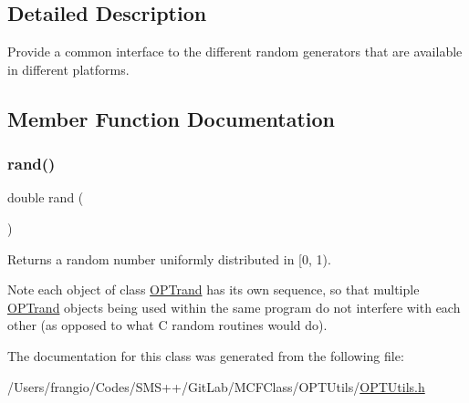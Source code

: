 \subsection{Detailed Description}
Provide a common interface to the different random generators that are available in different platforms. 

\subsection{Member Function Documentation}
\mbox{\label{class_o_p_ttypes__di__unipi__it_1_1_o_p_trand_afb2af72eb05fcf452da2d1c3a2e0b426}} 
\subsubsection{\texorpdfstring{rand()}{rand()}}
{\footnotesize\ttfamily double rand (\begin{DoxyParamCaption}\item[{void}]{ }\end{DoxyParamCaption})\hspace{0.3cm}{\ttfamily [inline]}}

Returns a random number uniformly distributed in \mbox{[}0, 1). \begin{DoxyNote}{Note}
each object of class \mbox{\hyperlink{class_o_p_ttypes__di__unipi__it_1_1_o_p_trand}{O\+P\+Trand}} has its own sequence, so that multiple \mbox{\hyperlink{class_o_p_ttypes__di__unipi__it_1_1_o_p_trand}{O\+P\+Trand}} objects being used within the same program do not interfere with each other (as opposed to what C random routines would do). 
\end{DoxyNote}


The documentation for this class was generated from the following file\+:\begin{DoxyCompactItemize}
\item 
/\+Users/frangio/\+Codes/\+S\+M\+S++/\+Git\+Lab/\+M\+C\+F\+Class/\+O\+P\+T\+Utils/\mbox{\hyperlink{_o_p_t_utils_8h}{O\+P\+T\+Utils.\+h}}\end{DoxyCompactItemize}
